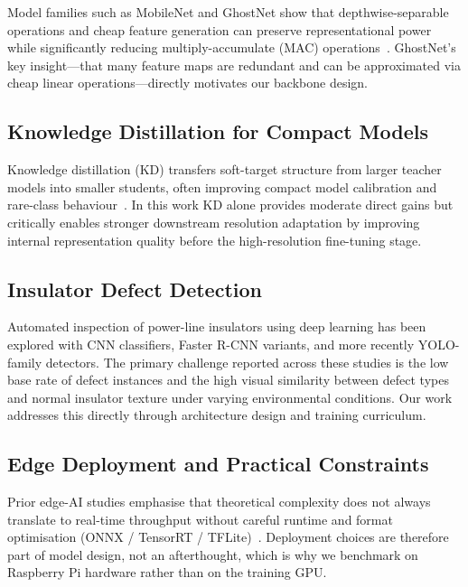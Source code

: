 \documentclass[11pt,a4paper]{article}
\begin{document}
Model families such as MobileNet and GhostNet show that depthwise-separable operations
and cheap feature generation can preserve representational power while significantly
reducing multiply-accumulate (MAC)
operations~\cite{howard2017mobilenets, han2020ghostnet}. GhostNet's key insight---that
many feature maps are redundant and can be approximated via cheap linear
operations---directly motivates our backbone design.

\subsection{Knowledge Distillation for Compact Models}

Knowledge distillation (KD) transfers soft-target structure from larger teacher models
into smaller students, often improving compact model calibration and rare-class
behaviour~\cite{hinton2015distilling, wang2022kd_survey}. In this work KD alone provides
moderate direct gains but critically enables stronger downstream resolution adaptation by
improving internal representation quality before the high-resolution fine-tuning stage.

\subsection{Insulator Defect Detection}

Automated inspection of power-line insulators using deep learning has been explored with
CNN classifiers, Faster R-CNN variants, and more recently YOLO-family detectors. The
primary challenge reported across these studies is the low base rate of defect instances
and the high visual similarity between defect types and normal insulator texture under
varying environmental conditions. Our work addresses this directly through architecture
design and training curriculum.

\subsection{Edge Deployment and Practical Constraints}

Prior edge-AI studies emphasise that theoretical complexity does not always translate to
real-time throughput without careful runtime and format optimisation (ONNX / TensorRT /
TFLite)~\cite{tan2019efficientnet, onnxruntime2024}. Deployment choices are therefore
part of model design, not an afterthought, which is why we benchmark on Raspberry Pi
hardware rather than on the training GPU.
\end{document}
